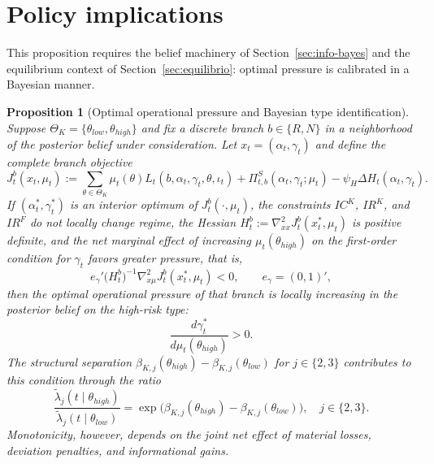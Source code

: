 \documentclass[ecta,nameyear,final,supplement]{econsocart}
\numberwithin{equation}{section}
\numberwithin{table}{section}
\newtheorem{proposition}[theorem]{Proposition}
\theoremstyle{definition}
\begin{document}
\section{Policy implications}
\label{sec:politica}

\noindent This proposition requires the belief machinery of
Section~\ref{sec:info-bayes} and the equilibrium context of
Section~\ref{sec:equilibrio}: optimal pressure is calibrated in a Bayesian
manner.


\begin{proposition}[Optimal operational pressure and Bayesian type identification]
\label{prop:optimal-gamma-beliefs}
Suppose $\Theta_K=\{\theta_{low},\theta_{high}\}$ and fix a discrete branch
$b\in\{R,N\}$ in a neighborhood of the posterior belief under consideration. Let
$x_t=(\alpha_t,\gamma_t)$ and define the complete branch objective
\begin{equation}
\label{eq:obj-rama-completo}
J_t^b(x_t,\mu_t)
:=
\sum_{\theta\in\Theta_K}\mu_t(\theta)
L_t(b,\alpha_t,\gamma_t,\theta,\iota_t)
+\Pi_{t,b}^{S}(\alpha_t,\gamma_t;\mu_t)
-\psi_H\Delta H_t(\alpha_t,\gamma_t).
\end{equation}
If $(\alpha_t^\ast,\gamma_t^\ast)$ is an interior optimum of
$J_t^b(\cdot,\mu_t)$, the constraints $IC^K$, $IR^K$, and $IR^F$ do not locally
change regime, the Hessian
$H_t^b:=\nabla_{xx}^2J_t^b(x_t^\ast,\mu_t)$ is positive definite, and the net
marginal effect of increasing $\mu_t(\theta_{high})$ on the first-order
condition for $\gamma_t$ favors greater pressure, that is,
\begin{equation}
\label{eq:monotonia-neta-gamma}
e_\gamma'
\bigl(H_t^b\bigr)^{-1}
\nabla_{x\mu}^2J_t^b(x_t^\ast,\mu_t)
<0,
\qquad
e_\gamma=(0,1)',
\end{equation}
then the optimal operational pressure of that branch is locally increasing in
the posterior belief on the high-risk type:
\[
\frac{d\gamma_t^\ast}{d\mu_t(\theta_{high})}>0.
\]
The structural separation $\beta_{K,j}(\theta_{high})-\beta_{K,j}(\theta_{low})$
for $j\in\{2,3\}$ contributes to this condition through the ratio
\[
\frac{\tilde\lambda_j(t\mid\theta_{high})}{\tilde\lambda_j(t\mid\theta_{low})}
=\exp\!\bigl(\beta_{K,j}(\theta_{high})-\beta_{K,j}(\theta_{low})\bigr),
\quad j\in\{2,3\}.
\]
Monotonicity, however, depends on the joint net effect of material losses,
deviation penalties, and informational gains.
\end{proposition}
\end{document}
